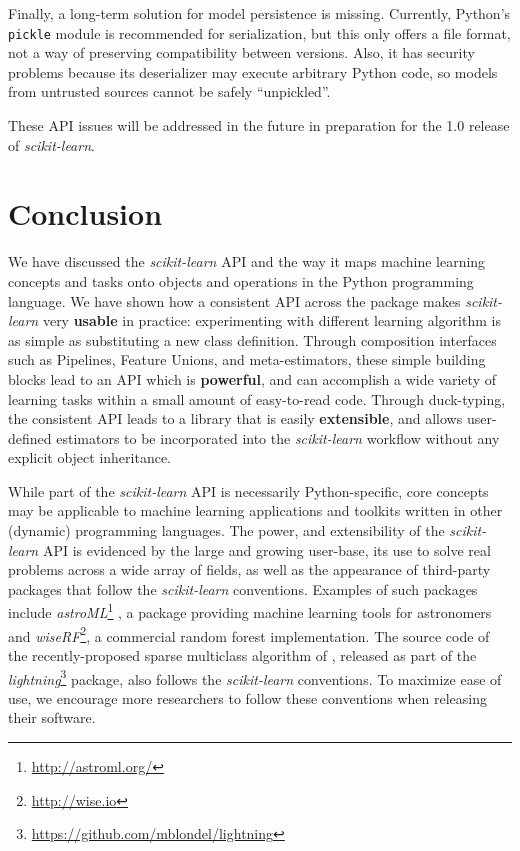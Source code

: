 \documentclass{llncs}
\newcommand{\sklearn}{\textit{scikit-learn}\xspace}
\begin{document}
Finally, a long-term solution for model persistence is missing.
Currently, Python's \texttt{pickle} module is recommended for serialization,
but this only offers a file format,
not a way of preserving compatibility between versions.
Also, it has security problems because its deserializer
may execute arbitrary Python code,
so models from untrusted sources cannot be safely ``unpickled''.

These API issues will be addressed in the future in preparation for
the 1.0 release of \sklearn.


\section{Conclusion}
\label{sec:conclusions}

We have discussed the \sklearn API
and the way it maps machine learning concepts and tasks
onto objects and operations in the Python programming language.
We have shown how a consistent API across the package makes \sklearn
very \textbf{usable} in practice: experimenting with different learning
algorithm is as simple as substituting a new class definition.
Through composition interfaces such as Pipelines, Feature Unions,
and meta-estimators, these simple building blocks lead to an API which is
\textbf{powerful}, and can accomplish a wide variety of learning tasks
within a small amount of easy-to-read code.
Through duck-typing, the consistent API leads to a library that is
easily \textbf{extensible}, and allows user-defined estimators to be
incorporated into the \sklearn workflow without any explicit object
inheritance.

While part of the \sklearn API is necessarily Python-specific,
core concepts may be applicable to
machine learning applications and toolkits
written in other (dynamic) programming languages.
The power, and extensibility of the \sklearn API is evidenced
by the large and growing user-base, its use to solve real
problems across a wide array of fields,
as well as the appearance of third-party packages
that follow the \sklearn conventions. Examples of such packages include
\textit{astroML}\footnote{\url{http://astroml.org/}}
\citep{vanderplas2012astroML}, a package providing
machine learning tools for astronomers and
\textit{wiseRF}\footnote{\url{http://wise.io}}, a commercial random forest
implementation. The source code of
the recently-proposed sparse multiclass
algorithm of \citet{mblondel-mlj2013}, released as
part of the
\textit{lightning}\footnote{\url{https://github.com/mblondel/lightning}}
package, also follows the \sklearn conventions.
To maximize ease of use, we encourage more researchers
to follow these conventions when releasing their software.
\end{document}
